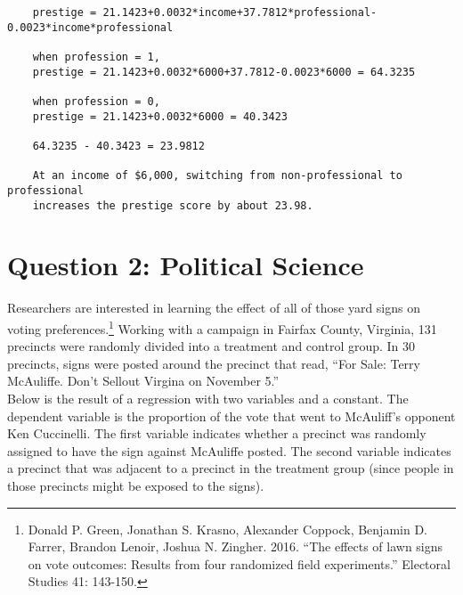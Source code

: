 \documentclass[12pt,letterpaper]{article}
\begin{document}
\begin{enumerate}
	\begin{verbatim}
	prestige = 21.1423+0.0032*income+37.7812*professional-0.0023*income*professional
	
	when profession = 1,
	prestige = 21.1423+0.0032*6000+37.7812-0.0023*6000 = 64.3235
	
	when profession = 0,
	prestige = 21.1423+0.0032*6000 = 40.3423
	
	64.3235 - 40.3423 = 23.9812
	
	At an income of $6,000, switching from non-professional to professional 
	increases the prestige score by about 23.98.
	\end{verbatim} 
	
\end{enumerate}

\newpage

\section*{Question 2: Political Science}
\vspace{.25cm}
\noindent 	Researchers are interested in learning the effect of all of those yard signs on voting preferences.\footnote{Donald P. Green, Jonathan	S. Krasno, Alexander Coppock, Benjamin D. Farrer,	Brandon Lenoir, Joshua N. Zingher. 2016. ``The effects of lawn signs on vote outcomes: Results from four randomized field experiments.'' Electoral Studies 41: 143-150. } Working with a campaign in Fairfax County, Virginia, 131 precincts were randomly divided into a treatment and control group. In 30 precincts, signs were posted around the precinct that read, ``For Sale: Terry McAuliffe. Don't Sellout Virgina on November 5.'' \\

Below is the result of a regression with two variables and a constant.  The dependent variable is the proportion of the vote that went to McAuliff's opponent Ken Cuccinelli. The first variable indicates whether a precinct was randomly assigned to have the sign against McAuliffe posted. The second variable indicates
a precinct that was adjacent to a precinct in the treatment group (since people in those precincts might be exposed to the signs).  \\
\end{document}
